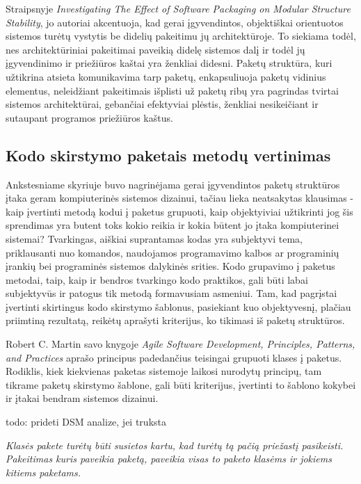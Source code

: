 Straipsnyje \textit{Investigating The Effect of Software Packaging on Modular Structure Stability}, jo autoriai akcentuoja, kad
gerai įgyvendintos, objektiškai orientuotos sistemos turėtų vystytis be didelių pakeitimu jų architektūroje.
To siekiama todėl, nes architektūriniai pakeitimai paveikią didelę sistemos dalį ir todėl
jų įgyvendinimo ir priežiūros kaštai yra ženkliai didesni\cite{ModularStability}.
Paketų struktūra, kuri užtikrina atsieta  komunikavima tarp paketų, enkapsuliuoja paketų vidinius elementus, neleidžiant pakeitimais
išplisti už paketų ribų yra pagrindas tvirtai sistemos architektūrai, gebančiai efektyviai plėstis, ženkliai nesikeičiant ir sutaupant programos priežiūros kaštus.

\subsection{Kodo skirstymo paketais metodų vertinimas}
Ankstesniame skyriuje buvo nagrinėjama gerai įgyvendintos paketų struktūros įtaka geram kompiuterinės sistemos dizainui,
tačiau lieka neatsakytas klausimas - kaip įvertinti metodą kodui į paketus grupuoti, kaip objektyiviai užtikrinti
jog šis sprendimas yra butent toks kokio reikia ir kokia būtent jo įtaka kompiuterinei sistemai?
Tvarkingas, aiškiai suprantamas kodas yra subjektyvi tema, priklausanti nuo komandos,
naudojamos programavimo kalbos ar programinių įrankių bei programinės sistemos dalykinės srities.
Kodo grupavimo į paketus metodai, taip, kaip ir bendros tvarkingo kodo praktikos,
gali būti labai subjektyvūs ir patogus tik metodą formavusiam asmeniui.
Tam, kad pagrįstai įvertinti skirtingus kodo skirstymo šablonus, pasiekiant kuo objektyvesnį,
plačiau priimtiną rezultatą, reikėtų aprašyti kriterijus, ko tikimasi iš paketų struktūros.

Robert C. Martin savo knygoje \textit{Agile Software Development, Principles, Patterns, and Practices} aprašo
principus padedančius teisingai grupuoti klases į paketus.
Rodiklis, kiek kiekvienas paketas sistemoje laikosi nurodytų principų, tam tikrame paketų skirstymo šablone, gali
būti kriterijus, įvertinti to šablono kokybei ir įtakai bendram sistemos dizainui.

todo: prideti DSM analize, jei truksta

\textit{Klasės pakete turėtų būti susietos kartu, kad turėtų tą pačią priežastį pasikeisti. Pakeitimas
kuris paveikia paketą, paveikia visas to paketo klasėms ir jokiems kitiems paketams.}

